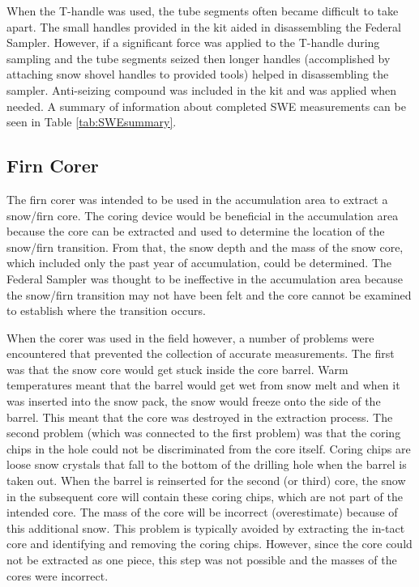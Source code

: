 \documentclass[12pt]{article}
\begin{document}
When the T-handle was used, the tube segments often became difficult to take apart. The small handles provided in the kit aided in disassembling the Federal Sampler. However, if a significant force was applied to the T-handle during sampling and the tube segments seized then longer handles (accomplished by attaching snow shovel handles to provided tools) helped in disassembling the sampler. Anti-seizing compound was included in the kit and was applied when needed. A summary of information about completed SWE measurements can be seen in Table \ref{tab:SWEsummary}.

\subsection{Firn Corer}

The firn corer was intended to be used in the accumulation area to extract a snow/firn core. The coring device would be beneficial in the accumulation area because the core can be extracted and used to determine the location of the snow/firn transition. From that, the snow depth and the mass of the snow core, which included only the past year of accumulation, could be determined. The Federal Sampler was thought to be ineffective in the accumulation area because the snow/firn transition may not have been felt and the core cannot be examined to establish where the transition occurs.

When the corer was used in the field however, a number of problems were encountered that prevented the collection of accurate measurements. The first was that the snow core would get stuck inside the core barrel. Warm temperatures meant that the barrel would get wet from snow melt and when it was inserted into the snow pack, the snow would freeze onto the side of the barrel. This meant that the core was destroyed in the extraction process. The second problem (which was connected to the first problem) was that the coring chips in the hole could not be discriminated from the core itself. Coring chips are loose snow crystals that fall to the bottom of the drilling hole when the barrel is taken out. When the barrel is reinserted for the second (or third) core, the snow in the subsequent core will contain these coring chips, which are not part of the intended core. The mass of the core will be incorrect (overestimate) because of this additional snow. This problem is typically avoided by extracting the in-tact core and identifying and removing the coring chips. However, since the core could not be extracted as one piece, this step was not possible and the masses of the cores were incorrect. 
\end{document}
